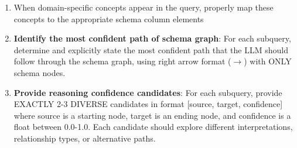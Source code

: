 \documentclass{article} %
\newcounter{promptcounter}
\newenvironment{promptbox}[2]{%
    \refstepcounter{promptcounter}%
    \label{#1}%
    \begin{tcolorbox}[
        colback=promptbg,
        colframe=promptborder,
        coltitle=white,
        colbacktitle=promptborder,
        title={\textbf{Prompt \thepromptcounter: #2}},
        fonttitle=\sffamily\bfseries,
        enhanced,
        breakable,
        attach boxed title to top left={yshift=-2mm, xshift=2mm},
        boxed title style={rounded corners},
        rounded corners,
        drop shadow,
        left=4pt,
        right=4pt,
        top=6pt,
        bottom=6pt
    ]%
}{%
    \end{tcolorbox}%
}
\begin{document}
\begin{promptbox}{prompt:seednodes:text-to-sql:lite}{Seed Node Selection for SQLite Graph}
\begin{enumerate}[itemsep=5pt]
\begin{itemize}
     \begin{itemize}
     \item SEMANTIC: Direct or indirect relevance to query concepts
     \item STRUCTURAL: Representing organizational structures in the query
     \item TEMPORAL: Time-based connections to query elements
     \item CAUSAL: Cause-effect relationships described in the query
     \item LOGICAL: Supporting logical conditions in the query
     \item STATISTICAL: Statistical correlations to query concepts
     \item DOMAIN-SPECIFIC: Domain relevancy with query
     \end{itemize}
   \item \textbf{Source nodes}: ALL STARTING COLUMNS (with table prefixes) having strong relationships of ANY TYPE ABOVE with the subquery.
   \item \textbf{Target nodes}: ALL DESTINATION COLUMNS (with table prefixes) having strong relationships of ANY TYPE ABOVE with the subquery.
   \item \textbf{MANDATORY}: You must examine and consider every single table.column combination in the schema before proceeding to the next step.
   \end{itemize}
\item When domain-specific concepts appear in the query, properly map these concepts to the appropriate schema column elements
\item \textbf{Identify the most confident path of schema graph}: For each subquery, determine and explicitly state the most confident path that the LLM should follow through the schema graph, using right arrow format ($\to$) with ONLY schema nodes.
\item \textbf{Provide reasoning confidence candidates}: For each subquery, provide EXACTLY 2-3 DIVERSE candidates in format [source, target, confidence] where source is a starting node, target is an ending node, and confidence is a float between 0.0-1.0. Each candidate should explore different interpretations, relationship types, or alternative paths.
\end{enumerate}


\end{promptbox}
\end{document}

